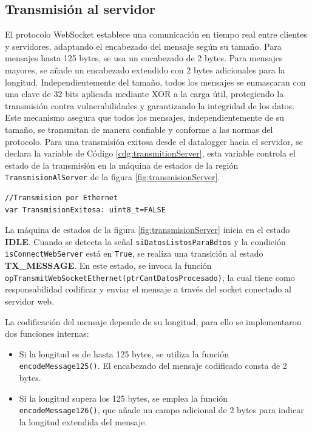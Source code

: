 \subsection{Transmisión al servidor}

El protocolo WebSocket establece una comunicación en tiempo real entre clientes y servidores, adaptando el encabezado del mensaje según su tamaño. Para mensajes hasta 125 bytes, se usa un encabezado de 2 bytes. Para mensajes mayores, se añade un encabezado extendido con 2 bytes adicionales para la longitud. Independientemente del tamaño, todos los mensajes se enmascaran con una clave de 32 bits aplicada mediante XOR a la carga útil, protegiendo la transmisión contra vulnerabilidades y garantizando la integridad de los datos. Este mecanismo asegura que todos los mensajes, independientemente de su tamaño, se transmitan de manera confiable y conforme a las normas del protocolo. Para una transmisión exitosa desde el datalogger hacia el servidor, se declara la variable de Código \ref{cdg:transmitionServer}, esta variable controla el estado de la transmisión en la máquina de estados de la región \texttt{TransmisionAlServer} de la figura \ref{fig:transmisionServer}.

\begin{lstlisting}[style=yakindustyle, caption={Declaración de variable para controlar el estado de una transmisión al servidor.}, label=cdg:transmitionServer]
//Transmision por Ethernet
var TransmisionExitosa: uint8_t=FALSE
\end{lstlisting}

La máquina de estados de la figura \ref{fig:transmisionServer} inicia en el estado \textbf{IDLE}. Cuando se detecta la señal \texttt{siDatosListosParaBdtos} y la condición \texttt{isConnectWebServer} está en \texttt{True}, se realiza una transición al estado \textbf{TX\_MESSAGE}. En este estado, se invoca la función\\ \texttt{opTransmitWebSocketEthernet(ptrCantDatosProcesado)}, la cual tiene como responsabilidad codificar y enviar el mensaje a través del socket conectado al servidor web.

La codificación del mensaje depende de su longitud, para ello se implementaron dos funciones internas:
\begin{itemize}
  \item Si la longitud es de hasta 125 bytes, se utiliza la función \texttt{encodeMessage125()}. El encabezado del mensaje codificado consta de 2 bytes.
  \item Si la longitud supera los 125 bytes, se emplea la función \texttt{encodeMessage126()}, que añade un campo adicional de 2 bytes para indicar la longitud extendida del mensaje.
\end{itemize}

